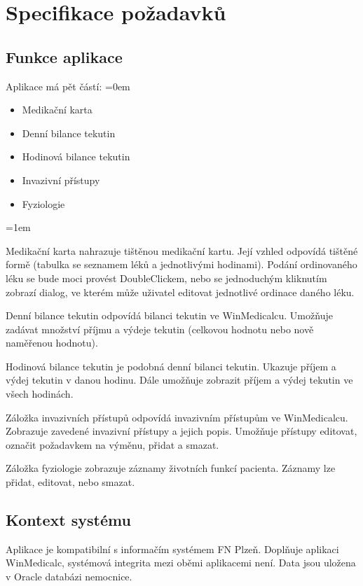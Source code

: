 \chapter{Specifikace požadavků}
\label{ch:specifikace}

\section{Funkce aplikace}

Aplikace má pět částí:
\parskip=0em
\begin{itemize}
	\item Medikační karta
	\item Denní bilance tekutin
	\item Hodinová bilance tekutin
	\item Invazivní přístupy
	\item Fyziologie
\end{itemize}
\parskip=1em

Medikační karta nahrazuje tištěnou medikační kartu. Její vzhled odpovídá tištěné formě (tabulka se seznamem léků a jednotlivými hodinami). Podání ordinovaného léku se bude moci provést DoubleClickem, nebo se jednoduchým kliknutím zobrazí dialog, ve kterém může uživatel editovat jednotlivé ordinace daného léku.

Denní bilance tekutin odpovídá bilanci tekutin ve WinMedicalcu. Umožňuje zadávat množství příjmu a výdeje tekutin (celkovou hodnotu nebo nově naměřenou hodnotu).

Hodinová bilance tekutin je podobná denní bilanci tekutin. Ukazuje příjem a výdej tekutin v danou hodinu. Dále umožňuje zobrazit příjem a výdej tekutin ve všech hodinách.

Záložka invazivních přístupů odpovídá invazivním přístupům ve WinMedicalcu. Zobrazuje zavedené invazivní přístupy a jejich popis. Umožňuje přístupy editovat, označit požadavkem na výměnu, přidat a smazat.

Záložka fyziologie zobrazuje záznamy životních funkcí pacienta. Záznamy lze přidat, editovat, nebo smazat.


\section{Kontext systému}

Aplikace je kompatibilní s informačím systémem FN Plzeň. Doplňuje aplikaci WinMedicalc, systémová integrita mezi oběmi aplikacemi není. Data jsou uložena v Oracle databázi nemocnice.

